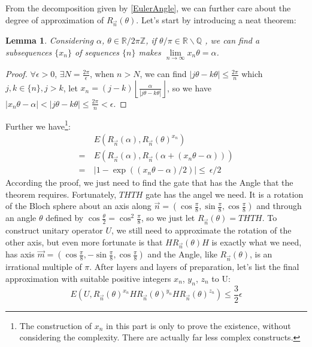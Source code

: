 \documentclass[a4paper,10pt]{article}
\newtheorem{lemma}{Lemma}[subsection]
\numberwithin{equation}{subsection}
\begin{document}
\vspace{.5cm}
From the decomposition given by \ref{EulerAngle}, we can further care about the degree of approximation of $R_{\vec{n}}(\theta)$. Let's start by introducing a neat theorem:
\begin{lemma}\label{AngleCoverR}
    Considering $\alpha$, $\theta \in \mathbb{R} /2\pi\mathbb{Z}$, if $\theta/\pi \in \mathbb{R} \backslash \mathbb{Q}$ , we can find a subsequences $\{x_n\}$ of sequences $\{n\}$ makes $\lim\limits_{n\to\infty}x_n\theta = \alpha$.
\end{lemma}
\begin{proof}
    $\forall \epsilon>0$, $\exists N=\frac{2\pi}{\epsilon}$, when $n>N$, we can find $|j\theta-k\theta|\leq\frac{2\pi}{n}$ which $j,k \in \{n\},j>k$, let $x_{n} = (j-k)\left\lfloor\frac{\alpha}{|j\theta-k\theta|}\right\rfloor$, so we have $|x_{n}\theta-\alpha|<|j\theta-k\theta|\leq\frac{2\pi}{n}<\epsilon$.
\end{proof}
Further we have\footnote{The construction of $x_{n}$ in this part is only to prove the existence, without considering the complexity. There are actually far less complex constructs.}:
\begin{equation}
    \begin{split}
          & \ E(R_{\vec{n}}(\alpha),R_{\vec{n}}(\theta)^{x_{n}})              \\
        = & \ E(R_{\vec{n}}(\alpha),R_{\vec{n}}(\alpha+(x_{n}\theta-\alpha))) \\
        = & \ |1-\exp((x_{n}\theta-\alpha)/2)|\leq\ \epsilon/2
    \end{split}
\end{equation}
According the proof, we just need to find the gate that has the Angle that the theorem requires. Fortunately, $THTH$ gate has the angel we need. It is a rotation of the Bloch sphere about an axis along $\vec{n} = (\cos\frac{\pi}{8},\sin\frac{\pi}{8},\cos\frac{\pi}{8})$ and through an angle $\theta$ defined by $\cos\frac{\theta}{2} = \cos^{2}\frac{\pi}{8}$, so we just let $R_{\vec{n}}(\theta) = THTH$. To construct unitary operator $U$, we still need to approximate the rotation of the other axis, but even more fortunate is that $HR_{\vec{n}}(\theta)H$ is exactly what we need, has axis $\vec{m} = (\cos\frac{\pi}{8},-\sin\frac{\pi}{8},\cos\frac{\pi}{8})$ and the Angle, like $R_{\vec{n}}(\theta)$, is an irrational multiple of $\pi$. After layers and layers of preparation, let's list the final approximation with suitable positive integers $x_{n}$, $y_{n}$, $z_{n}$ to U:
\begin{equation}\label{FinalApproximation}
    E(U,R_{\vec{n}}(\theta)^{x_{n}}HR_{\vec{n}}(\theta)^{y_{n}}HR_{\vec{n}}(\theta)^{z_{n}}) \leq \frac{3}{2}\epsilon
\end{equation}
\end{document}
